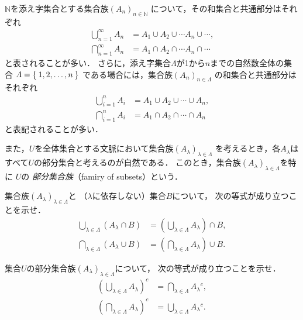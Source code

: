     $\mathbb{N}$を添え字集合とする集合族$(A_n)_{n \in \mathbb{N}}$
    について，その和集合と共通部分はそれぞれ
    \begin{align}
      \bigcup_{n=1}^{\infty} A_n & = A_1 \cup A_2 \cup \cdots A_n \cup \cdots 
      \label{eq:nsetfamirycup} , \\
      \bigcap_{n=1}^{\infty} A_n & = A_1 \cap A_2 \cap \cdots A_n \cap \cdots
      \label{eq:nsetfamirycap}
    \end{align}
    と表されることが多い．
    さらに，添え字集合$\varLambda$が1から$n$までの自然数全体の集合
    $\varLambda = \Set{1,  2,  \ldots ,  n}$
    である場合には，集合族$(A_n)_{n \in \varLambda}$
    の和集合と共通部分はそれぞれ
    \begin{align}
      \bigcup_{i=1}^{n} A_i & = A_1 \cup A_2 \cup \cdots \cup A_n ,
      \label{eq:fnisetfamirycup} \\
      \bigcap_{i=1}^{n} A_i & = A_1 \cap A_2 \cap \cdots \cap A_n
      \label{eq:fnisetfamirycap}
    \end{align}
    と表記されることが多い．

    また，$U$を全体集合とする文脈において集合族$(A_\lambda)_{\lambda \in \varLambda}$
    を考えるとき，各$A_\lambda$はすべて$U$の部分集合と考えるのが自然である．
    このとき，集合族$(A_\lambda)_{\lambda \in \varLambda}$を特に
    $U$の
    \emph{部分集合族}（famiry of subsets）という．

    \begin{que} \label{que:setfamilycupcap}
      集合族$(A _\lambda)_{\lambda \in \varLambda}$と
      （$\lambda$に依存しない）集合$B$について，
      次の等式が成り立つことを示せ．
      \begin{align}
        \bigcup_{\lambda \in \varLambda} \left( A_\lambda \cap B \right)
        & = \left( \bigcup_{\lambda \in \varLambda} A_\lambda \right) \cap B ,
        \label{eq:famirysetcupB} \\
        \bigcap_{\lambda \in \varLambda} \left( A_\lambda \cup B \right)
        & = \left( \bigcap_{\lambda \in \varLambda} A_\lambda \right) \cup B.
        \label{eq:famirysetcapB}
      \end{align}
    \end{que}

    \begin{que} \label{que:demorganfamiry}
      集合$U$の部分集合族$(A_\lambda)_{\lambda \in \varLambda}$について，
      次の等式が成り立つことを示せ．
      \begin{align}
        \left( \bigcup_{\lambda \in \varLambda} A_\lambda \right) ^c
        & = \bigcap_{\lambda \in \varLambda} A_\lambda {}^c ,
        \label{eq:demorganfamirycup} \\
        \left( \bigcap_{\lambda \in \varLambda} A_\lambda \right) ^c
        & = \bigcup_{\lambda \in \varLambda} A_\lambda {}^c .
        \label{eq:demorganfamirycap}
      \end{align}
    \end{que}

